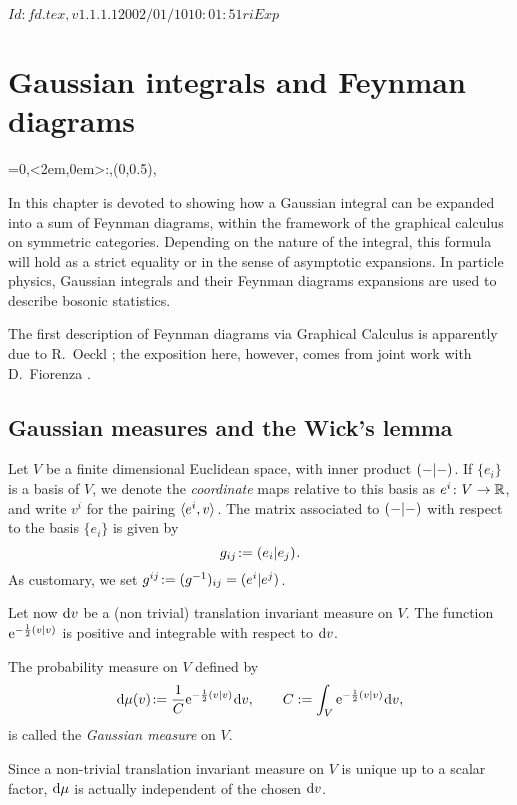 \RCSID $Id: fd.tex,v 1.1.1.1 2002/01/10 10:01:51 ri Exp $


\chapter{Gaussian integrals and Feynman diagrams}
\label{sec:fd}
\everyxy={0,<2em,0em>:,(0,0.5),} %

In this chapter is devoted to showing how a Gaussian integral can be
expanded into a sum of Feynman diagrams, within the framework of the
graphical calculus on symmetric categories.  Depending on the nature
of the integral, this formula will hold as a strict equality or in the
sense of asymptotic expansions. In particle physics, Gaussian
integrals and their Feynman diagrams expansions are used to describe
bosonic statistics.

The first description of Feynman diagrams via Graphical Calculus is
apparently due to R.~Oeckl \cite{oeckl;braided-qft}; the exposition
here, however, comes from joint work with D.~Fiorenza
\cite{murri-fiorenza;feynman}. 


\section{Gaussian measures and the Wick's lemma} 

Let \(V\) be a finite dimensional Euclidean space,
with inner product \(( -|- )_{}\). If \(\{e_i\}\) is a basis of
\(V\), we denote the \emph{coordinate} maps relative to this basis as
\(e^i\colon V\to\mathbb{R}\), and write \(v^i\) for the pairing
\(\langle e^i,v \rangle_{}\).  The matrix associated to \(( -|- )_{}\) with
respect to the basis \(\{e_i\}\) is given by
\begin{equation*}
  g_{ij} \joinrel:= \inner{e_i}{e_j}.
\end{equation*}
As customary, we set \(g^{ij} \joinrel:= (g^{-1})_{ij} = \inner{e^i}{e^j}\).

Let now \(\mathrm{d} v\) be a (non trivial) translation invariant measure on
\(V\). The function \(\mathrm{e}^{-\frac{1}{2}( v|v )_{}}\) is positive and
integrable with respect to \(\mathrm{d} v\).
\begin{definition}\label{dfn:gaussian-measure}
  The probability measure on \(V\) defined by
  \begin{equation*}
    \ud\mu(v) \joinrel:= \frac{1}{C} \E^{-\onehalf\inner{v}{v}} \ud v, 
    \qquad
    C := {\int_V \E^{-\onehalf\inner{v}{v}} \ud v},
  \end{equation*}
  is called the \emph{Gaussian measure} on \(V\).
\end{definition}
Since a non-trivial translation invariant measure on \(V\) is unique up
to a scalar factor, \(\mathrm{d}\mu\) is actually independent of the chosen
\(\mathrm{d} v\).

